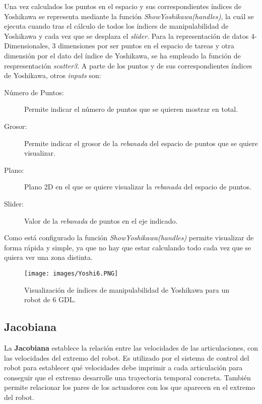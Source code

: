 \documentclass[a4paper, fontsize=11pt]{scrartcl} %
\numberwithin{equation}{section} %
\numberwithin{figure}{section} %
\numberwithin{table}{section} %
\begin{document}
	Una vez calculados los puntos en el espacio y sus correspondientes índices de Yoshikawa se representa mediante la función \textit{ShowYoshikawa(handles)}, la cuál se ejecuta cuando tras el cálculo de todos los índices de manipulabilidad de Yoshikawa y cada vez que se desplaza el \textit{slider}. Para la representación de datos 4-Dimensionales, 3 dimensiones por ser puntos en el espacio de tareas y otra dimensión por el dato del índice de Yoshikawa, se ha empleado la función de respresentación \textit{scatter3}. A parte de los puntos y de sus correspondientes índices de Yoshikawa, otros \textit{inputs} son:
	\begin{description}
		\item[Número de Puntos:] Permite indicar el número de puntos que se quieren mostrar en total.
		\item[Grosor:] Permite indicar el grosor de la \textit{rebanada} del espacio de puntos que se quiere visualizar.
		\item[Plano:] Plano 2D en el que se quiere visualizar la \textit{rebanada} del espacio de puntos.
		\item[Slider:] Valor de la \textit{rebanada} de puntos en el eje indicado.
	\end{description}
	
	Como está configurado la función \textit{ShowYoshikawa(handles)} permite visualizar de forma rápida y simple, ya que no hay que estar calculando todo cada vez que se quiera ver una zona distinta.\\
	
	\begin{figure}[h!]
		\centering
		\texttt{[image: images/Yoshi6.PNG]}
		\caption{Visualización de índices de manipulabilidad de Yoshikawa para un robot de 6 GDL.}
		\label{Yoshi_6GDL}
	\end{figure}
	\FloatBarrier
	
	\subsection{Jacobiana}
	
	La \textbf{Jacobiana} establece la relación entre las velocidades de las articulaciones, con las velocidades del extremo del robot. Es utilizado por el sistema de control del robot para establecer qué velocidades debe imprimir a cada articulación para conseguir que el extremo desarrolle una trayectoria temporal concreta. También permite relacionar los pares de los actuadores con los que aparecen en el extremo del robot.\\
	
\end{document}
